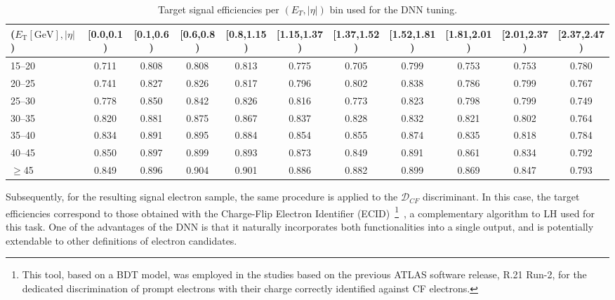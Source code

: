 \begin{table}[htbp]
  \centering
  \caption{Target signal efficiencies per $(E_T, |\eta|)$ bin used for the DNN tuning.}
  \renewcommand{\arraystretch}{1.2}
  \setlength{\tabcolsep}{0.8pt}
  \scriptsize
  \begin{tabular}{lcccccccccc}
  \toprule
  ($E_{\text{T}}[\text{GeV}],|\eta|$) 
  & \tiny{[0.0,0.1)} & \tiny{[0.1,0.6)} & \tiny{[0.6,0.8)} & \tiny{[0.8,1.15)} & \tiny{[1.15,1.37)} & \tiny{[1.37,1.52)} & \tiny{[1.52,1.81)} & \tiny{[1.81,2.01)} & \tiny{[2.01,2.37)} & \tiny{[2.37,2.47)} \\
  \midrule
  \tiny{15--20}  & 0.711 & 0.808 & 0.808 & 0.813 & 0.775 & 0.705 & 0.799 & 0.753 & 0.753 & 0.780 \\
  \tiny{20--25}  & 0.741 & 0.827 & 0.826 & 0.817 & 0.796 & 0.802 & 0.838 & 0.786 & 0.799 & 0.767 \\
  \tiny{25--30}  & 0.778 & 0.850 & 0.842 & 0.826 & 0.816 & 0.773 & 0.823 & 0.798 & 0.799 & 0.749 \\
  \tiny{30--35}  & 0.820 & 0.881 & 0.875 & 0.867 & 0.837 & 0.828 & 0.832 & 0.821 & 0.802 & 0.764 \\
  \tiny{35--40}  & 0.834 & 0.891 & 0.895 & 0.884 & 0.854 & 0.855 & 0.874 & 0.835 & 0.818 & 0.784 \\
  \tiny{40--45}  & 0.850 & 0.897 & 0.899 & 0.893 & 0.873 & 0.849 & 0.891 & 0.861 & 0.834 & 0.792 \\
  \tiny{$\geq$45} & 0.849 & 0.896 & 0.904 & 0.901 & 0.886 & 0.882 & 0.899 & 0.869 & 0.847 & 0.793 \\
  \bottomrule
  \end{tabular}
  \end{table}
  

Subsequently, for the resulting signal electron sample, the same procedure is applied to the $\mathcal{D}_{CF}$ discriminant. In this case, the target efficiencies correspond to those obtained with the Charge-Flip Electron Identifier (ECID)~\footnote{This tool, based on a BDT model, was employed in the studies based on the previous ATLAS software release, R.21 Run-2, for the dedicated discrimination of prompt electrons with their charge correctly identified against CF electrons.}~\cite{Aaboud:2657964}, a complementary algorithm to LH used for this task. One of the advantages of the DNN is that it naturally incorporates both functionalities into a single output, and is potentially extendable to other definitions of electron candidates.

